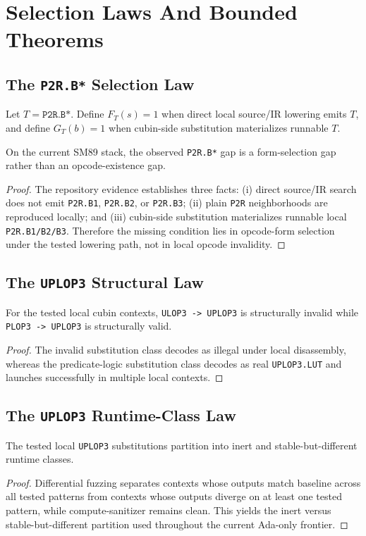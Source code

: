 \appendix
\section{Selection Laws And Bounded Theorems}

\subsection{The \texttt{P2R.B*} Selection Law}

Let $T = \texttt{P2R.B*}$. Define $F_T(s)=1$ when direct local source/IR
lowering emits $T$, and define $G_T(b)=1$ when cubin-side substitution
materializes runnable $T$.

\begin{theorem}
On the current SM89 stack, the observed \texttt{P2R.B*} gap is a form-selection
gap rather than an opcode-existence gap.
\end{theorem}

\begin{proof}
The repository evidence establishes three facts: (i) direct source/IR search
does not emit \texttt{P2R.B1}, \texttt{P2R.B2}, or \texttt{P2R.B3}; (ii) plain
\texttt{P2R} neighborhoods are reproduced locally; and (iii) cubin-side
substitution materializes runnable local \texttt{P2R.B1/B2/B3}. Therefore the
missing condition lies in opcode-form selection under the tested lowering path,
not in local opcode invalidity.
\end{proof}

\subsection{The \texttt{UPLOP3} Structural Law}

\begin{theorem}
For the tested local cubin contexts, \texttt{ULOP3 -> UPLOP3} is structurally
invalid while \texttt{PLOP3 -> UPLOP3} is structurally valid.
\end{theorem}

\begin{proof}
The invalid substitution class decodes as illegal under local disassembly,
whereas the predicate-logic substitution class decodes as real
\texttt{UPLOP3.LUT} and launches successfully in multiple local contexts.
\end{proof}

\subsection{The \texttt{UPLOP3} Runtime-Class Law}

\begin{theorem}
The tested local \texttt{UPLOP3} substitutions partition into inert and
stable-but-different runtime classes.
\end{theorem}

\begin{proof}
Differential fuzzing separates contexts whose outputs match baseline across all
tested patterns from contexts whose outputs diverge on at least one tested
pattern, while compute-sanitizer remains clean. This yields the inert versus
stable-but-different partition used throughout the current Ada-only frontier.
\end{proof}
